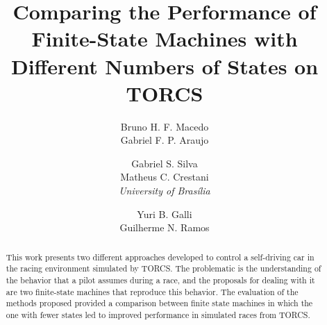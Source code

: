 \documentclass[a4paper]{sbgames}
\title{Comparing the Performance of Finite-State Machines with Different Numbers of States on TORCS}
\author{Bruno H. F. Macedo\\Gabriel F. P. Araujo\\
		\and Gabriel S. Silva\\Matheus C. Crestani\\\textit{University of Bras\'{i}lia}
		\and Yuri B. Galli\\ Guilherme N. Ramos\\
}
\begin{document}
	\maketitle

	\begin{abstract}
		
		This work presents two different approaches developed to control a self-driving car in the racing environment simulated by TORCS. The problematic is the understanding of the behavior that a pilot assumes during a race, and the proposals for dealing with it are two finite-state machines that reproduce this behavior. The evaluation of the methods proposed provided a comparison between finite state machines in which the one with fewer states led to improved performance in simulated races from TORCS.
		
	\end{abstract}

	\keywordlist
	\contactlist
	
	
	
	
	
	
	

	
	
	
	
\end{document}
